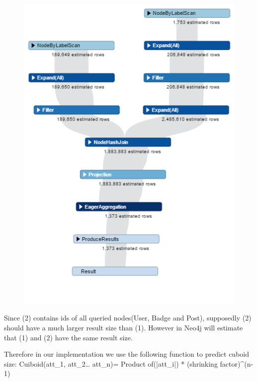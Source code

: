 \begin {figure}[H]
\centering
\includegraphics[scale=0.6]{pic/61.png}
\end{figure}

Since (2) contains ids of all queried nodes(User, Badge and Post), supposedly (2) should have a much larger result size than (1). However in Neo4j will estimate that (1) and (2) have the same result size. 

Therefore in our implementation we use the following function to predict cuboid size:
Cuiboid(att_1, att_2… att_n)= Product of(|att_i|) * (shrinking factor)^(n-1)

